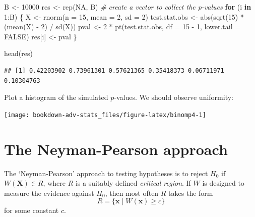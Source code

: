 \documentclass[
]{book}
\newenvironment{Shaded}{\begin{snugshade}}{\end{snugshade}}
\newcommand{\AttributeTok}[1]{\textcolor[rgb]{0.77,0.63,0.00}{#1}}
\newcommand{\CommentTok}[1]{\textcolor[rgb]{0.56,0.35,0.01}{\textit{#1}}}
\newcommand{\ConstantTok}[1]{\textcolor[rgb]{0.00,0.00,0.00}{#1}}
\newcommand{\ControlFlowTok}[1]{\textcolor[rgb]{0.13,0.29,0.53}{\textbf{#1}}}
\newcommand{\DecValTok}[1]{\textcolor[rgb]{0.00,0.00,0.81}{#1}}
\newcommand{\FunctionTok}[1]{\textcolor[rgb]{0.00,0.00,0.00}{#1}}
\newcommand{\NormalTok}[1]{#1}
\newcommand{\OtherTok}[1]{\textcolor[rgb]{0.56,0.35,0.01}{#1}}
\newcommand{\SpecialCharTok}[1]{\textcolor[rgb]{0.00,0.00,0.00}{#1}}
\newcommand{\bx}{{\boldsymbol x}}
\newcommand{\bX}{{\boldsymbol X}}
\theoremstyle{definition}
\theoremstyle{definition}
\theoremstyle{definition}
\theoremstyle{definition}
\theoremstyle{remark}
\begin{document}
\begin{Shaded}
\begin{Highlighting}[]
\NormalTok{B }\OtherTok{\textless{}{-}} \DecValTok{10000}
\NormalTok{res }\OtherTok{\textless{}{-}} \FunctionTok{rep}\NormalTok{(}\ConstantTok{NA}\NormalTok{, B)  }\CommentTok{\# create a vector to collect the p{-}values}
\ControlFlowTok{for}\NormalTok{ (i }\ControlFlowTok{in} \DecValTok{1}\SpecialCharTok{:}\NormalTok{B) \{}
\NormalTok{  X }\OtherTok{\textless{}{-}} \FunctionTok{rnorm}\NormalTok{(}\AttributeTok{n =} \DecValTok{15}\NormalTok{, }\AttributeTok{mean =} \DecValTok{2}\NormalTok{, }\AttributeTok{sd =} \DecValTok{2}\NormalTok{)}
\NormalTok{  test.stat.obs }\OtherTok{\textless{}{-}} \FunctionTok{abs}\NormalTok{(}\FunctionTok{sqrt}\NormalTok{(}\DecValTok{15}\NormalTok{) }\SpecialCharTok{*}\NormalTok{ (}\FunctionTok{mean}\NormalTok{(X) }\SpecialCharTok{{-}} \DecValTok{2}\NormalTok{) }\SpecialCharTok{/} \FunctionTok{sd}\NormalTok{(X))}
\NormalTok{  pval }\OtherTok{\textless{}{-}} \DecValTok{2} \SpecialCharTok{*} \FunctionTok{pt}\NormalTok{(test.stat.obs, }\AttributeTok{df =} \DecValTok{15} \SpecialCharTok{{-}} \DecValTok{1}\NormalTok{, }\AttributeTok{lower.tail =} \ConstantTok{FALSE}\NormalTok{)}
\NormalTok{  res[i] }\OtherTok{\textless{}{-}}\NormalTok{ pval}
\NormalTok{\}}

\FunctionTok{head}\NormalTok{(res)}
\end{Highlighting}
\end{Shaded}

\begin{verbatim}
## [1] 0.42203902 0.73961301 0.57621365 0.35418373 0.06711971 0.10304763
\end{verbatim}

Plot a histogram of the simulated \(p\)-values. We should observe uniformity:

\begin{center}\texttt{[image: bookdown-adv-stats\_files/figure-latex/binomp4-1]} \end{center}

\hypertarget{the-neyman-pearson-approach}{%
\section{The Neyman-Pearson approach}\label{the-neyman-pearson-approach}}

The `Neyman-Pearson' approach to testing hypotheses is to reject \(H_0\) if \(W(\bX)\in R\), where \(R\) is a suitably defined \emph{critical region}. If \(W\) is designed to measure the evidence against \(H_0\), then most often \(R\) takes the form
\[
R = \{\bx \mid W(\bx) \geq c \}
\]
for some constant \(c\).
\end{document}
